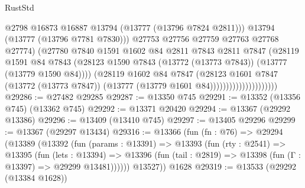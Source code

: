\begin{lexlean}{RustStd}
\begin{coremodule}
                                          @2798
                                          @16873
                                          @16887
                                          @13794
                                          (@13777 (@13796 @7824 @2811)))
                                        @13794
                                        (@13777 (@13796 @7781 @7830)))
                                      @27753
                                      @27756
                                      @27759
                                      @27763
                                      @27768
                                      @27774)
                                    (@27780
                                      @7840
                                      @1591
                                      @1602
                                      @84
                                      @2811
                                      @7843
                                      @2811
                                      @7847
                                      (@28119
                                        @1591
                                        @84
                                        @7843
                                        (@28123
                                          @1590
                                          @7843
                                          (@13772 (@13773 @7843))
                                          (@13777 (@13779 @1590 @84))))
                                      (@28119
                                        @1602
                                        @84
                                        @7847
                                        (@28123
                                          @1601
                                          @7847
                                          (@13772 (@13773 @7847))
                                          (@13777 (@13779 @1601 @84)))))))))))))))))))))
@29286 := @27482 @29285
@29287 := @13350 @745
@29291 := @13352 (@13356 @745) (@13362 @745)
@29292 := @13371 @20420
@29294 := @13367 (@29292 @13386)
@29296 := @13409 (@13410 @745)
@29297 := @13405 @29296
@29299 := @13367 (@29297 @13434)
@29316 := @13366
    (fun (fn : @76) =>
    @29294
      (@13389
        (@13392
          (fun (params : @13391) =>
          @13393
            (fun (rty : @2541) =>
            @13395
              (fun (lets : @13394) =>
              @13396 (fun (tail : @2819) => @13398 (fun (Γ : @13397) => @29299 @13481))))))
        @13527))
    @1628
@29319 := @13533 (@29292 (@13384 @1628))

\end{coremodule}
\end{lexlean}
